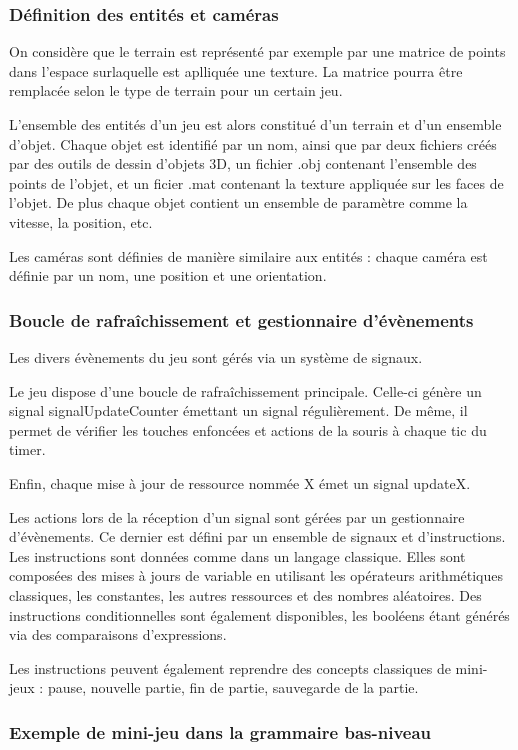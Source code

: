 \subsubsection{Définition des entités et caméras}

On considère que le terrain est représenté par exemple par une matrice de points dans l'espace surlaquelle est aplliquée une texture.
La matrice pourra être remplacée selon le type de terrain pour un certain jeu. 

L'ensemble des entités d'un jeu est alors constitué d'un terrain et d'un ensemble d'objet.
Chaque objet est identifié par un nom, ainsi que par deux fichiers créés par des outils de dessin d'objets 3D, un fichier .obj contenant l'ensemble
des points de l'objet, et un ficier .mat contenant la texture appliquée sur les faces de l'objet.
De plus chaque objet contient un ensemble de paramètre comme la vitesse, la position, etc. 

Les caméras sont définies de manière similaire aux entités : chaque caméra est définie par un nom, une position et une orientation.


\subsubsection{Boucle de rafraîchissement et gestionnaire d'évènements}

Les divers évènements du jeu sont gérés via un système de signaux.

Le jeu dispose d'une boucle de rafraîchissement principale. Celle-ci génère un signal
signalUpdateCounter émettant un signal régulièrement.
De même, il permet de vérifier les touches enfoncées et actions de la souris à chaque tic du timer.

Enfin, chaque mise à jour de ressource nommée X émet un signal updateX.

Les actions lors de la réception d'un signal sont gérées par un gestionnaire d'évènements.
Ce dernier est défini par un ensemble de signaux et d'instructions.
Les instructions sont données comme dans un langage classique.
Elles sont composées des mises à jours de variable en utilisant les opérateurs arithmétiques classiques, les constantes, les autres ressources et des nombres
aléatoires.
Des instructions conditionnelles sont également disponibles, les booléens étant générés via des comparaisons d'expressions.

Les instructions peuvent également reprendre des concepts classiques de mini-jeux : pause, nouvelle partie, fin de partie, sauvegarde de la partie.

\subsubsection{Exemple de mini-jeu dans la grammaire bas-niveau}

